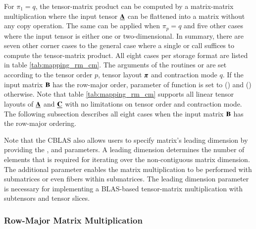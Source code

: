 For $\pi_1 = q$, the tensor-matrix product can be computed by a matrix-matrix multiplication where the input tensor $\underline{\mathbf{A}}$ can be flattened into a matrix without any copy operation.
The same can be applied when $\pi_p = q$ and five other cases where the input tensor is either one or two-dimensional.
In summary, there are seven other corner cases to the general case where a single  or  call suffices to compute the tensor-matrix product.
All eight cases per storage format are listed in table \ref{tab:mapping_rm_cm}.
The arguments of the routines  or  are set according to the tensor order $p$, tensor layout $\boldsymbol{\pi}$ and contraction mode $q$.
If the input matrix $\mathbf{B}$ has the row-major order, parameter  of function  is set to  () and  () otherwise.
Note that table \ref{tab:mapping_rm_cm} supports all linear tensor layouts of $\underline{\mathbf{A}}$ and $\underline{\mathbf{C}}$ with no limitations on tensor order and contraction mode.
The following subsection describes all eight cases when the input matrix $\mathbf{B}$ has the row-major ordering.

Note that the CBLAS also allows users to specify matrix's leading dimension by providing the ,  and  parameters.
A leading dimension determines the number of elements that is required for iterating over the non-contiguous matrix dimension.
The additional parameter enables the matrix multiplication to be performed with submatrices or even fibers within submatrices.
The leading dimension parameter is necessary for implementing a BLAS-based tensor-matrix multiplication with subtensors and tensor slices.



\subsubsection{Row-Major Matrix Multiplication}

